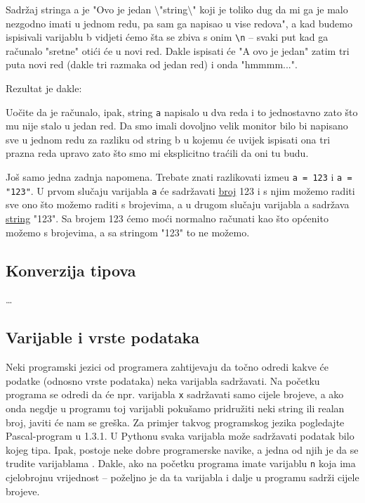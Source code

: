 	Sadr\v{z}aj stringa a je "Ovo je jedan $\setminus$"string$\setminus$" koji je toliko dug da mi ga je malo nezgodno imati u jednom redu, pa sam ga napisao u vise redova",
	a kad budemo ispisivali varijablu b vidjeti \'{c}emo \v{s}ta se zbiva s onim
	\verb+\n+ -- svaki put kad ga ra\v{c}unalo "sretne" oti\'{c}i \'{c}e u novi red.
	Dakle ispisati \'{c}e "A ovo je jedan" zatim tri puta novi red (dakle tri razmaka
	od jedan red) i onda "hmmmm...".

	Rezultat je dakle:


Uo\v{c}ite da je ra\v{c}unalo, ipak, string \verb+a+ napisalo u
dva reda i to jednostavno zato \v{s}to mu nije stalo u jedan red.
Da smo imali dovoljno velik monitor bilo bi napisano sve u jednom
redu za razliku od string b u kojemu \'{c}e uvijek ispisati ona
tri prazna reda upravo zato \v{s}to smo mi eksplicitno tra\'{c}ili
da oni tu budu.

Jo\v{s} samo jedna zadnja napomena. Trebate znati razlikovati
izme\dj{}u \verb+a = 123+ i \verb+a = "123"+. U prvom slu\v{c}aju
varijabla \verb+a+ \'{c}e sadr\v{z}avati \underline{broj} 123 i s
njim mo\v{z}emo raditi sve ono \v{s}to mo\v{z}emo raditi s brojevima,
a u drugom slu\v{c}aju varijabla a sadr\v{z}ava \underline{string}
"123". Sa brojem 123 \'{c}emo mo\'{c}i normalno ra\v{c}unati kao
\v{s}to op\'{c}enito mo\v{z}emo s brojevima, a sa stringom "123"
to ne mo\v{z}emo.

\subsection{Konverzija tipova}

\dots

\subsection{Varijable i vrste podataka}

Neki programski jezici od programera zahtijevaju da to\v{c}no odredi
kakve \'{c}e podatke (odnosno vrste podataka) neka varijabla
sadr\v{z}avati. Na po\v{c}etku programa se odredi da \'{c}e npr.
varijabla \verb+x+ sadr\v{z}avati samo cijele brojeve, a ako onda
negdje u programu toj varijabli poku\v{s}amo pridru\v{z}iti neki
string ili realan broj, javiti \'{c}e nam se gre\v{s}ka. Za primjer
takvog programskog jezika pogledajte Pascal-program u 1.3.1.  U
Pythonu svaka varijabla mo\v{z}e sadr\v{z}avati podatak bilo kojeg
tipa. Ipak, postoje neke dobre programerske navike, a jedna od njih
je da se trudite varijablama . Dakle, ako na po\v{c}etku programa
imate varijablu \verb+n+ koja ima cjelobrojnu vrijednost --
po\v{z}eljno je da ta varijabla i dalje u programu sadr\v{z}i cijele
brojeve.


